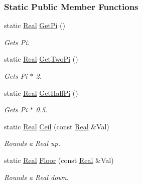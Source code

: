 \subsubsection*{Static Public Member Functions}
\begin{DoxyCompactItemize}
\item 
static \hyperlink{namespacephys_af7eb897198d265b8e868f45240230d5f}{Real} \hyperlink{classphys_1_1MathTool_a322cfb38abc59cc8e6e20cc95a53c976}{GetPi} ()
\begin{DoxyCompactList}\small\item\em Gets Pi. \item\end{DoxyCompactList}\item 
static \hyperlink{namespacephys_af7eb897198d265b8e868f45240230d5f}{Real} \hyperlink{classphys_1_1MathTool_a7b3fef73ed82d585755d11a001290f65}{GetTwoPi} ()
\begin{DoxyCompactList}\small\item\em Gets Pi $\ast$ 2. \item\end{DoxyCompactList}\item 
static \hyperlink{namespacephys_af7eb897198d265b8e868f45240230d5f}{Real} \hyperlink{classphys_1_1MathTool_a38e1c4e2ff8827e915ddfbd7fb8037cd}{GetHalfPi} ()
\begin{DoxyCompactList}\small\item\em Gets Pi $\ast$ 0.5. \item\end{DoxyCompactList}\item 
static \hyperlink{namespacephys_af7eb897198d265b8e868f45240230d5f}{Real} \hyperlink{classphys_1_1MathTool_adddaab80e2e5d5a76e123f3ce491d3e7}{Ceil} (const \hyperlink{namespacephys_af7eb897198d265b8e868f45240230d5f}{Real} \&Val)
\begin{DoxyCompactList}\small\item\em Rounds a Real up. \item\end{DoxyCompactList}\item 
static \hyperlink{namespacephys_af7eb897198d265b8e868f45240230d5f}{Real} \hyperlink{classphys_1_1MathTool_a551b68b7ff6934c450a1d15dc3c8a33c}{Floor} (const \hyperlink{namespacephys_af7eb897198d265b8e868f45240230d5f}{Real} \&Val)
\begin{DoxyCompactList}\small\item\em Rounds a Real down. \item\end{DoxyCompactList}\item 

\end{DoxyCompactItemize}
